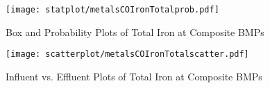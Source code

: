         \begin{figure}[hb]   %
            \centering
            \texttt{[image: statplot/metalsCOIronTotalprob.pdf]}
            \caption{Box and Probability Plots of Total Iron at Composite BMPs}
        \end{figure}         %
        
        
        \begin{figure}[hb]   %
            \centering
            \texttt{[image: scatterplot/metalsCOIronTotalscatter.pdf]}
            \caption{Influent vs. Effluent Plots of Total Iron at Composite BMPs}
        \end{figure}         %
        \clearpage
        